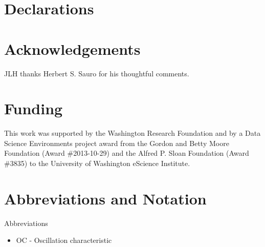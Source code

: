 \documentclass{bmcart}
\begin{document}
\section*{Declarations}
\begin{backmatter}

\section*{Acknowledgements}%
JLH thanks Herbert S. Sauro for his thoughtful comments.

\section*{Funding}%
This work was supported by the Washington Research Foundation and by a Data Science Environments project award from the Gordon and Betty Moore Foundation (Award \#2013-10-29) and the Alfred P. Sloan Foundation (Award \#3835) to the University of Washington eScience Institute.

\section*{Abbreviations and Notation}
Abbreviations
\begin{itemize}
\item 
OC - Oscillation characteristic
\end{itemize}


\end{backmatter}
\end{document}

